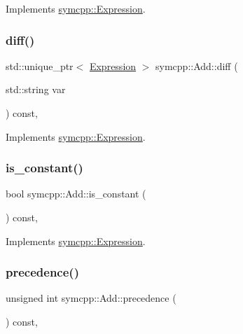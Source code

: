 Implements \mbox{\hyperlink{classsymcpp_1_1Expression_a2e7de5a295ccf0efdc9b34cea7ba3d0b}{symcpp\+::\+Expression}}.

\mbox{\label{classsymcpp_1_1Add_ac885da5635431d264c643618729f6cec}} 
\subsubsection{\texorpdfstring{diff()}{diff()}}
{\footnotesize\ttfamily std\+::unique\+\_\+ptr$<$ \mbox{\hyperlink{classsymcpp_1_1Expression}{Expression}} $>$ symcpp\+::\+Add\+::diff (\begin{DoxyParamCaption}\item[{std\+::string}]{var }\end{DoxyParamCaption}) const\hspace{0.3cm}{\ttfamily [override]}, {\ttfamily [virtual]}}



Implements \mbox{\hyperlink{classsymcpp_1_1Expression_a032fe8da79d5e231ca2d21a201c8f32d}{symcpp\+::\+Expression}}.

\mbox{\label{classsymcpp_1_1Add_a6a9286402a1b24bf3a7c1ed348357875}} 
\subsubsection{\texorpdfstring{is\_constant()}{is\_constant()}}
{\footnotesize\ttfamily bool symcpp\+::\+Add\+::is\+\_\+constant (\begin{DoxyParamCaption}{ }\end{DoxyParamCaption}) const\hspace{0.3cm}{\ttfamily [override]}, {\ttfamily [virtual]}}



Implements \mbox{\hyperlink{classsymcpp_1_1Expression_a30db7917c8948e22330cbe8259caeae2}{symcpp\+::\+Expression}}.

\mbox{\label{classsymcpp_1_1Add_aec3ebe2c1bde461d8bd086e9c87aeeed}} 
\subsubsection{\texorpdfstring{precedence()}{precedence()}}
{\footnotesize\ttfamily unsigned int symcpp\+::\+Add\+::precedence (\begin{DoxyParamCaption}{ }\end{DoxyParamCaption}) const\hspace{0.3cm}{\ttfamily [override]}, {\ttfamily [virtual]}}



